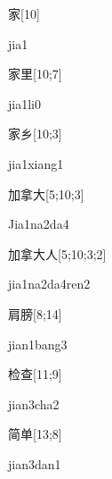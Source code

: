 \begin{verbete}[jia1]{家}[10]
\begin{pronuncia}{jia1}
\end{pronuncia}
\end{verbete}

\begin{verbete}[jia1li0]{家里}[10;7]
\begin{pronuncia}{jia1li0}
\end{pronuncia}
\end{verbete}

\begin{verbete}{家乡}[10;3]
\begin{pronuncia}{jia1xiang1}
\end{pronuncia}
\end{verbete}

\begin{verbete}[Jia1na2da4]{加拿大}[5;10;3]
\begin{pronuncia}{Jia1na2da4}
\end{pronuncia}
\end{verbete}

\begin{verbete}{加拿大人}[5;10;3;2]
\begin{pronuncia}[\\]{jia1na2da4ren2}
\end{pronuncia}
\end{verbete}

\begin{verbete}{肩膀}[8;14]
\begin{pronuncia}{jian1bang3}
\end{pronuncia}
\end{verbete}

\begin{verbete}{检查}[11;9]
\begin{pronuncia}{jian3cha2}
\end{pronuncia}
\end{verbete}

\begin{verbete}{简单}[13;8]
\begin{pronuncia}{jian3dan1}
\end{pronuncia}
\end{verbete}

